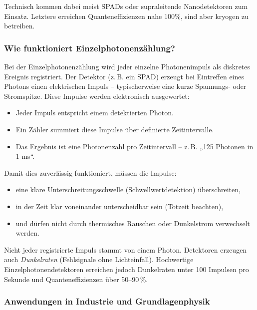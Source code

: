 Technisch kommen dabei meist SPADs oder supraleitende Nanodetektoren zum Einsatz. Letztere erreichen Quanteneffizienzen nahe 100\%, sind aber kryogen zu betreiben.
\newpage
\noindent
\subsubsection*{Wie funktioniert Einzelphotonenzählung?}
Bei der Einzelphotonenzählung wird jeder einzelne Photonenimpuls als diskretes Ereignis registriert. Der Detektor (z.\,B. ein SPAD) erzeugt bei Eintreffen eines Photons einen elektrischen Impuls – typischerweise eine kurze Spannungs- oder Stromspitze. Diese Impulse werden elektronisch ausgewertet:

\begin{itemize}
	\item Jeder Impuls entspricht einem detektierten Photon.
	\item Ein Zähler summiert diese Impulse über definierte Zeitintervalle.
	\item Das Ergebnis ist eine Photonenzahl pro Zeitintervall – z.\,B. „125 Photonen in 1 ms“.
\end{itemize}

Damit dies zuverlässig funktioniert, müssen die Impulse:
\begin{itemize}
	\item eine klare Unterschreitungsschwelle (Schwellwertdetektion) überschreiten,
	\item in der Zeit klar voneinander unterscheidbar sein (Totzeit beachten),
	\item und dürfen nicht durch thermisches Rauschen oder Dunkelstrom verwechselt werden.
\end{itemize}
\vspace{1em}
\begin{tcolorbox}[didaktikbox, title=Was zählt als Photon? ]
	\label{box:photonenzaehlung}
	\small
	Nicht jeder registrierte Impuls stammt von einem Photon. Detektoren erzeugen auch \emph{Dunkelraten} (Fehlsignale ohne Lichteinfall). Hochwertige Einzelphotonendetektoren erreichen jedoch Dunkelraten unter 100 Impulsen pro Sekunde und Quanteneffizienzen über 50–90\,\%.
\end{tcolorbox}

\subsubsection{Anwendungen in Industrie und Grundlagenphysik}

